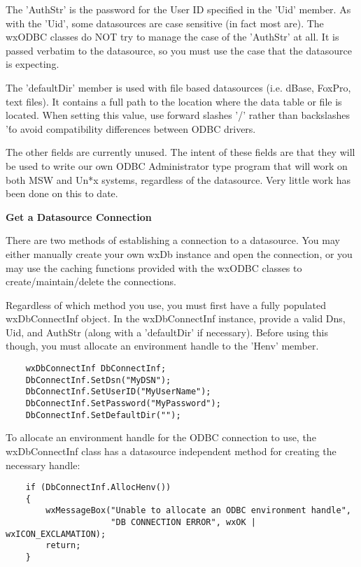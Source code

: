 The 'AuthStr' is the password for the User ID specified in the 'Uid' member. 
As with the 'Uid', some datasources are case sensitive (in fact most are). 
The wxODBC classes do NOT try to manage the case of the 'AuthStr' at all. 
It is passed verbatim to the datasource, so you must use the case that the 
datasource is expecting.

The 'defaultDir' member is used with file based datasources (i.e. dBase, 
FoxPro, text files). It contains a full path to the location where the 
data table or file is located. When setting this value, use forward 
slashes '/' rather than backslashes '\' to avoid compatibility differences 
between ODBC drivers.

The other fields are currently unused. The intent of these fields are that 
they will be used to write our own ODBC Administrator type program that will 
work on both MSW and Un*x systems, regardless of the datasource. Very little 
work has been done on this to date.

{\bf Get a Datasource Connection}

There are two methods of establishing a connection to a datasource. You 
may either manually create your own wxDb instance and open the connection, 
or you may use the caching functions provided with the wxODBC classes to 
create/maintain/delete the connections.

Regardless of which method you use, you must first have a fully populated 
wxDbConnectInf object. In the wxDbConnectInf instance, provide a valid 
Dns, Uid, and AuthStr (along with a 'defaultDir' if necessary). Before 
using this though, you must allocate an environment handle to the 'Henv' 
member.

\begin{verbatim}
    wxDbConnectInf DbConnectInf;
    DbConnectInf.SetDsn("MyDSN");
    DbConnectInf.SetUserID("MyUserName");
    DbConnectInf.SetPassword("MyPassword");
    DbConnectInf.SetDefaultDir("");
\end{verbatim}

To allocate an environment handle for the ODBC connection to use, the 
wxDbConnectInf class has a datasource independent method for creating 
the necessary handle:

\begin{verbatim}
    if (DbConnectInf.AllocHenv())
    {
        wxMessageBox("Unable to allocate an ODBC environment handle",
                     "DB CONNECTION ERROR", wxOK | wxICON_EXCLAMATION);
        return;
    } 
\end{verbatim}

